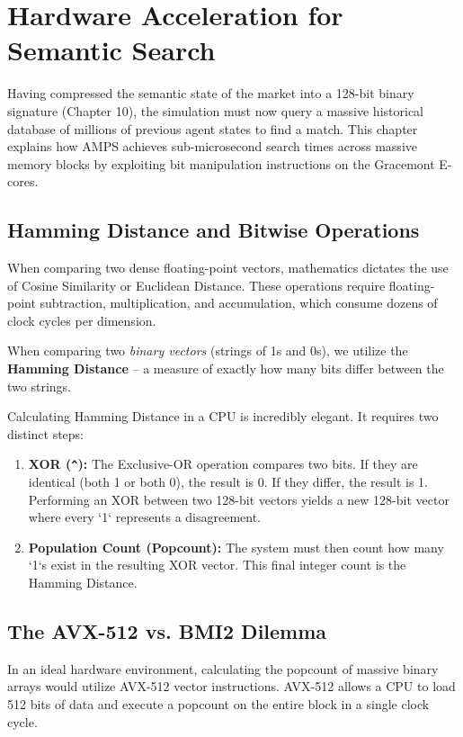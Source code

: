 \chapter{Hardware Acceleration for Semantic Search}
\label{ch:hardware_acceleration_search}

Having compressed the semantic state of the market into a 128-bit binary signature (Chapter 10), the simulation must now query a massive historical database of millions of previous agent states to find a match. This chapter explains how AMPS achieves sub-microsecond search times across massive memory blocks by exploiting bit manipulation instructions on the Gracemont E-cores.

\section{Hamming Distance and Bitwise Operations}

When comparing two dense floating-point vectors, mathematics dictates the use of Cosine Similarity or Euclidean Distance. These operations require floating-point subtraction, multiplication, and accumulation, which consume dozens of clock cycles per dimension.

When comparing two \textit{binary vectors} (strings of 1s and 0s), we utilize the \textbf{Hamming Distance} -- a measure of exactly how many bits differ between the two strings.

Calculating Hamming Distance in a CPU is incredibly elegant. It requires two distinct steps:
\begin{enumerate}
    \item \textbf{XOR (\texttt{\^{}}):} The Exclusive-OR operation compares two bits. If they are identical (both 1 or both 0), the result is 0. If they differ, the result is 1. Performing an XOR between two 128-bit vectors yields a new 128-bit vector where every `1` represents a disagreement.
    \item \textbf{Population Count (Popcount):} The system must then count how many `1`s exist in the resulting XOR vector. This final integer count is the Hamming Distance.
\end{enumerate}

\section{The AVX-512 vs. BMI2 Dilemma}

In an ideal hardware environment, calculating the popcount of massive binary arrays would utilize AVX-512 vector instructions. AVX-512 allows a CPU to load 512 bits of data and execute a popcount on the entire block in a single clock cycle.


